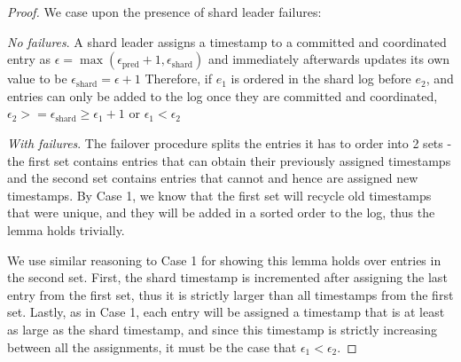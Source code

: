 \begin{proof}
We case upon the presence of shard leader failures:

 \textit{No failures}.
A shard leader assigns a timestamp to a committed and coordinated entry as 
$\epsilon = \max(\epsilon_{\text{pred}} + 1, \epsilon_{\text{shard}})$ and immediately afterwards updates its own value to be 
$\epsilon_{\text{shard}} = \epsilon + 1$
Therefore, if $e_1$ is ordered in the shard log before $e_2$, and entries can only be added to the log once they are committed and coordinated, 
$\epsilon_2 >= \epsilon_{\text{shard}} \geq \epsilon_1 + 1$ or
$\epsilon_1 < \epsilon_2$

 \textit{With failures}.
The failover procedure splits the entries it has to order into 2 sets - the first set contains entries that can obtain their previously assigned timestamps and the second set contains entries that cannot and hence are assigned new timestamps. By Case 1, we know that the first set will recycle old timestamps that were unique, and they will be added in a sorted order to the log, thus the lemma holds trivially.

We use similar reasoning to Case 1 for showing this lemma holds over entries in the second set. First, the shard timestamp is incremented after assigning the last entry from the first set, thus it is strictly larger than all timestamps from the first set. Lastly, as in Case 1, each entry will be assigned a timestamp that is at least as large as the shard timestamp, and since this timestamp is strictly increasing between all the assignments, it must be the case that $\epsilon_1 < \epsilon_2$.





\end{proof}

